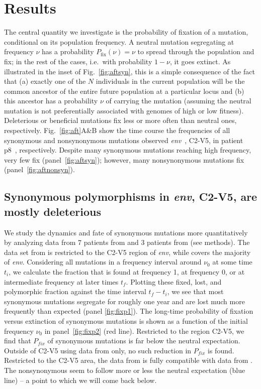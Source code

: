 \documentclass[rmp, twocolumn]{revtex4}
\newcommand{\pfix}{P_{fix}}
\newcommand{\FIG}[1]{Fig.~\ref{fig:#1}}
\newcommand{\env}{\textit{env}}
\begin{document}
\section{Results}

The central quantity we investigate is the probability of fixation of a
mutation, conditional on its population frequency.  A neutral mutation
segregating at frequency $\nu$ has a probability $P_\text{fix}(\nu) = \nu$ to
spread through the population and fix; in the rest of the cases, i.e.~with
probability $1-\nu$, it goes extinct. As illustrated in the inset of \FIG{aftsyn},
this is a simple consequence of the fact that
(a) exactly one of the $N$ individuals in the current population will be
the common ancestor of the entire future population at a particular locus and
(b) this ancestor has a probability $\nu$ of carrying the mutation (assuming
the neutral mutation is not preferentially associated with genomes of high or
low fitness).
Deleterious or beneficial mutations fix less or
more often than neutral ones, respectively. \FIG{aft}A\&B show 
the time course the frequencies of all synonymous and nonsynonymous mutations
observed \env~, C2-V5, in patient p8~\citep{shankarappa_consistent_1999},
respectively. Despite many synonymous mutations reaching high frequency, very
few fix (panel~\ref{fig:aftsyn}); however, many nonsynonymous mutations fix
(panel~\ref{fig:aftnonsyn}).

\subsection{Synonymous polymorphisms in \env, C2-V5, are mostly deleterious}
We study the dynamics and fate of synonymous mutations more quantitatively by
analyzing data from 7 patients from
\citet{shankarappa_consistent_1999,liu_selection_2006} and 3 patients from
\citet{bunnik_autologous_2008} (see methods). The data set from
\citet{shankarappa_consistent_1999,liu_selection_2006} is restricted to the
C2-V5 region of \env, while \citet{bunnik_autologous_2008} covers the
majority of \env. Considering all mutations in a
frequency interval around $\nu_0$ at some time $t_i$, we calculate the fraction
that is found at frequency 1, at frequency 0, or at intermediate frequency at
later times $t_f$. Plotting these fixed, lost, and polymorphic fraction against
the time interval $t_f-t_i$, we see that most synonymous mutations segregate for
roughly one year and are lost much more frequently than expected (panel
\ref{fig:fixp1}). The long-time probability of fixation versus extinction of
synonymous mutations is shown as a function of the initial frequency $\nu_0$ in
panel~\ref{fig:fixp2} (red line). Restricted to the region C2-V5, we find that
$\pfix$ of synonymous mutations is far below the neutral expectation.
Outside of C2-V5 using data from \citet{bunnik_autologous_2008} only, no such
reduction in $\pfix$ is found. Restricted to the C2-V5 area, the data from
\citet{bunnik_autologous_2008} is fully compatible with data from
\citet{shankarappa_consistent_1999}. The nonsynonymous seem to follow more or
less the neutral expectation (blue line) -- a point to which we will come back below.
\end{document}
